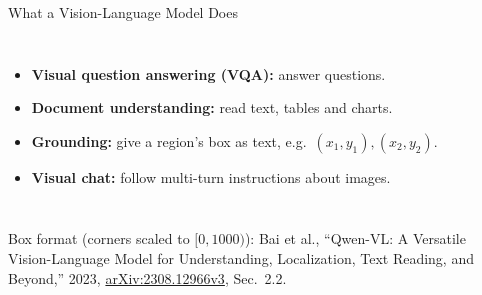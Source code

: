 \begin{frame}{What a Vision-Language Model Does}
\begin{columns}[T,onlytextwidth]
\begin{itemize}
        \item \textbf{Visual question answering (VQA):} answer questions.
        \item \textbf{Document understanding:} read text, tables and charts.
        \item \textbf{Grounding:} give a region's box as text, e.g.\ $(x_1,y_1),(x_2,y_2)$.
        \item \textbf{Visual chat:} follow multi-turn instructions about images.
      \end{itemize}
  \end{columns}
  \vspace{0.2em}
  {\scriptsize Box format (corners scaled to $[0,1000)$): Bai et al., ``Qwen-VL: A Versatile Vision-Language Model for Understanding, Localization, Text Reading, and Beyond,'' 2023, \href{https://arxiv.org/abs/2308.12966v3}{arXiv:2308.12966v3}, Sec.~2.2.\par}
\end{frame}

